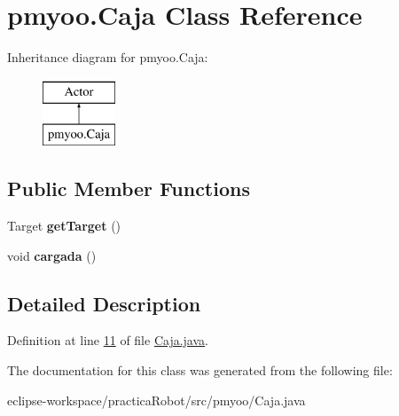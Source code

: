 \hypertarget{classpmyoo_1_1_caja}{}\section{pmyoo.\+Caja Class Reference}
\label{classpmyoo_1_1_caja}
Inheritance diagram for pmyoo.\+Caja\+:\begin{figure}[H]
\begin{center}
\leavevmode
\includegraphics[height=2.000000cm]{classpmyoo_1_1_caja}
\end{center}
\end{figure}
\subsection*{Public Member Functions}
\begin{DoxyCompactItemize}
\item 
\mbox{\label{classpmyoo_1_1_caja_a204316abd186f845190949d57772419b}} 
Target {\bfseries get\+Target} ()
\item 
\mbox{\label{classpmyoo_1_1_caja_a88d192e4cb84c7aa253626163fc244bb}} 
void {\bfseries cargada} ()
\end{DoxyCompactItemize}


\subsection{Detailed Description}


Definition at line \mbox{\hyperlink{_caja_8java_source_l00011}{11}} of file \mbox{\hyperlink{_caja_8java_source}{Caja.\+java}}.



The documentation for this class was generated from the following file\+:\begin{DoxyCompactItemize}
\item 
eclipse-\/workspace/practica\+Robot/src/pmyoo/Caja.\+java\end{DoxyCompactItemize}
